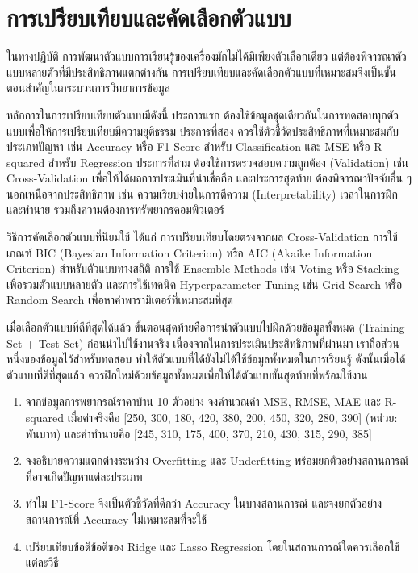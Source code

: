 \section{การเปรียบเทียบและคัดเลือกตัวแบบ}
ในทางปฏิบัติ การพัฒนาตัวแบบการเรียนรู้ของเครื่องมักไม่ได้มีเพียงตัวเลือกเดียว แต่ต้องพิจารณาตัวแบบหลายตัวที่มีประสิทธิภาพแตกต่างกัน การเปรียบเทียบและคัดเลือกตัวแบบที่เหมาะสมจึงเป็นขั้นตอนสำคัญในกระบวนการวิทยาการข้อมูล

หลักการในการเปรียบเทียบตัวแบบมีดังนี้ ประการแรก ต้องใช้ข้อมูลชุดเดียวกันในการทดสอบทุกตัวแบบเพื่อให้การเปรียบเทียบมีความยุติธรรม ประการที่สอง ควรใช้ตัวชี้วัดประสิทธิภาพที่เหมาะสมกับประเภทปัญหา เช่น Accuracy หรือ F1-Score สำหรับ Classification และ MSE หรือ R-squared สำหรับ Regression ประการที่สาม ต้องใช้การตรวจสอบความถูกต้อง (Validation) เช่น Cross-Validation เพื่อให้ได้ผลการประเมินที่น่าเชื่อถือ และประการสุดท้าย ต้องพิจารณาปัจจัยอื่น ๆ นอกเหนือจากประสิทธิภาพ เช่น ความเรียบง่ายในการตีความ (Interpretability) เวลาในการฝึกและทำนาย รวมถึงความต้องการทรัพยากรคอมพิวเตอร์

วิธีการคัดเลือกตัวแบบที่นิยมใช้ ได้แก่ การเปรียบเทียบโดยตรงจากผล Cross-Validation การใช้เกณฑ์ BIC (Bayesian Information Criterion) หรือ AIC (Akaike Information Criterion) สำหรับตัวแบบทางสถิติ การใช้ Ensemble Methods เช่น Voting หรือ Stacking เพื่อรวมตัวแบบหลายตัว และการใช้เทคนิค Hyperparameter Tuning เช่น Grid Search หรือ Random Search เพื่อหาค่าพารามิเตอร์ที่เหมาะสมที่สุด

เมื่อเลือกตัวแบบที่ดีที่สุดได้แล้ว ขั้นตอนสุดท้ายคือการนำตัวแบบไปฝึกด้วยข้อมูลทั้งหมด (Training Set + Test Set) ก่อนนำไปใช้งานจริง เนื่องจากในการประเมินประสิทธิภาพที่ผ่านมา เราถือส่วนหนึ่งของข้อมูลไว้สำหรับทดสอบ ทำให้ตัวแบบที่ได้ยังไม่ได้ใช้ข้อมูลทั้งหมดในการเรียนรู้ ดังนั้นเมื่อได้ตัวแบบที่ดีที่สุดแล้ว ควรฝึกใหม่ด้วยข้อมูลทั้งหมดเพื่อให้ได้ตัวแบบขั้นสุดท้ายที่พร้อมใช้งาน

\begin{exercise}
\begin{enumerate}
\item จากข้อมูลการพยากรณ์ราคาบ้าน 10 ตัวอย่าง จงคำนวณค่า MSE, RMSE, MAE และ R-squared เมื่อค่าจริงคือ [250, 300, 180, 420, 380, 200, 450, 320, 280, 390] (หน่วย: พันบาท) และค่าทำนายคือ [245, 310, 175, 400, 370, 210, 430, 315, 290, 385]

\item จงอธิบายความแตกต่างระหว่าง Overfitting และ Underfitting พร้อมยกตัวอย่างสถานการณ์ที่อาจเกิดปัญหาแต่ละประเภท

\item ทำไม F1-Score จึงเป็นตัวชี้วัดที่ดีกว่า Accuracy ในบางสถานการณ์ และจงยกตัวอย่างสถานการณ์ที่ Accuracy ไม่เหมาะสมที่จะใช้

\item เปรียบเทียบข้อดีข้อดีของ Ridge และ Lasso Regression โดยในสถานการณ์ใดควรเลือกใช้แต่ละวิธี
\end{enumerate}
\end{exercise}

\newpage
